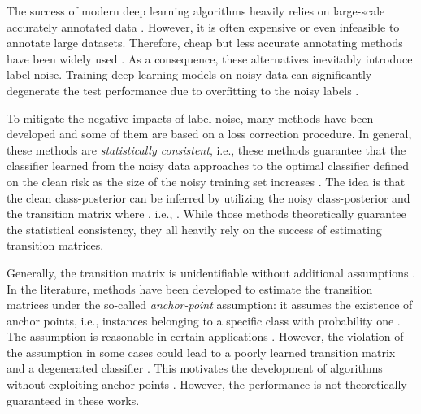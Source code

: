 \documentclass{article}
\begin{document}
The success of modern deep learning algorithms heavily relies on large-scale accurately annotated data \cite{daniely2019generalization, han2020survey, xia2020part, berthon2020confidence}. However, it is often expensive or even infeasible to annotate large datasets. Therefore, cheap but less accurate annotating methods have been widely used \cite{xiao2015learning, li2017webvision, han2020sigua, yu2020label, zhu2020second}. As a consequence, these alternatives inevitably introduce label noise. Training deep learning models on noisy data can significantly degenerate the test performance due to overfitting to the noisy labels \cite{arpit2017closer, zhang2016understanding, xia2021robust, wu2020class2simi}.




To mitigate the negative impacts of label noise, many methods have been developed and some of them are based on a loss correction procedure. In general, these methods are \textit{statistically consistent}, i.e., these methods guarantee that the classifier learned from the noisy data approaches to the optimal classifier defined on the clean risk as the size of the noisy training set increases \cite{liu2016classification,scott2015rate,natarajan2013learning,goldberger2016training,patrini2017making,thekumparampil2018robustness}. The idea is that the clean class-posterior  can be inferred by utilizing the noisy class-posterior  and the transition
matrix  where , i.e., . While those methods  theoretically guarantee the statistical consistency, they all heavily rely on the success of estimating transition matrices.






Generally, the transition matrix is unidentifiable without additional assumptions \cite{xia2019anchor}. In the literature, methods have been developed to estimate the transition matrices under the so-called \emph{anchor-point} assumption: it assumes the existence of anchor points, i.e., instances belonging to a specific class with probability one \cite{liu2016classification}. The assumption is reasonable in certain applications \cite{liu2016classification,patrini2017making}. However, the violation of the assumption in some cases could lead to a poorly learned transition matrix and a degenerated classifier \cite{xia2019anchor}. This motivates the development of algorithms without exploiting anchor points \cite{xia2019anchor, liu2020peer, xu2019l_dmi, zhu2021clusterability}. However, the performance is not theoretically guaranteed in these works. 
\end{document}
